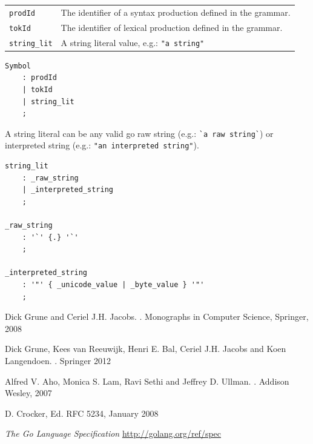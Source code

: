 \documentclass[12pt]{article}
\begin{document}
\begin{longtable}{ll}
	\verb|prodId| & The identifier of a syntax production defined in the grammar. \\
	\verb|tokId| & The identifier of lexical production defined in the grammar. \\
	\verb|string_lit| & A string literal value, e.g.: \verb|"a string"| \\
\end{longtable}

\begin{Verbatim}[frame=single]
Symbol
    : prodId
    | tokId
    | string_lit
    ;
\end{Verbatim}

A string literal can be any valid go raw string (e.g.: \verb|`a raw string`|) or interpreted string (e.g.: \verb|"an interpreted string"|).

\begin{Verbatim}[frame=single]
string_lit 
    : _raw_string 
    | _interpreted_string 
    ;

_raw_string 
    : '`' {.} '`' 
    ;

_interpreted_string 
    : '"' { _unicode_value | _byte_value } '"' 
    ;
\end{Verbatim}




\nocite{Parsing, Modern Compiler Design, Dragon Book, ABNF}
\begin{thebibliography}{99}
	Dick Grune and Ceriel J.H. Jacobs.
	.
	\newblock Monographs in Computer Science, Springer, 2008
	
	Dick Grune, Kees van Reeuwijk, Henri E. Bal, Ceriel J.H. Jacobs and Koen Langendoen.
	.
	\newblock Springer 2012

	Alfred V. Aho, Monica S. Lam, Ravi Sethi and Jeffrey D. Ullman.
	.
	\newblock Addison Wesley, 2007

	D. Crocker, Ed.
	\newblock RFC 5234, January 2008

	{\em The Go Language Specification}
	\newblock \url{http://golang.org/ref/spec}

	
\end{thebibliography}
\end{document}

